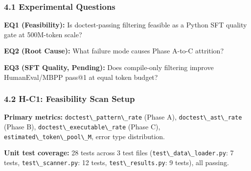 
\subsubsection{4.1 Experimental Questions}

\textbf{EQ1 (Feasibility):} Is doctest-passing filtering feasible as a Python SFT quality gate
at 500M-token scale?

\textbf{EQ2 (Root Cause):} What failure mode causes Phase A-to-C attrition?

\textbf{EQ3 (SFT Quality, Pending):} Does compile-only filtering improve HumanEval/MBPP pass@1
at equal token budget?

\subsubsection{4.2 H-C1: Feasibility Scan Setup}

\begin{table}[htbp]
\centering
{}
\end{table}

\textbf{Primary metrics:} \texttt{doctest\textbackslash \_pattern\textbackslash \_rate} (Phase A), \texttt{doctest\textbackslash \_ast\textbackslash \_rate} (Phase B),
\texttt{doctest\textbackslash \_executable\textbackslash \_rate} (Phase C), \texttt{estimated\textbackslash \_token\textbackslash \_pool\textbackslash \_M}, error type distribution.

\textbf{Unit test coverage:} 28 tests across 3 test files (\texttt{test\textbackslash \_data\textbackslash \_loader.py}: 7 tests,
\texttt{test\textbackslash \_scanner.py}: 12 tests, \texttt{test\textbackslash \_results.py}: 9 tests), all passing.

